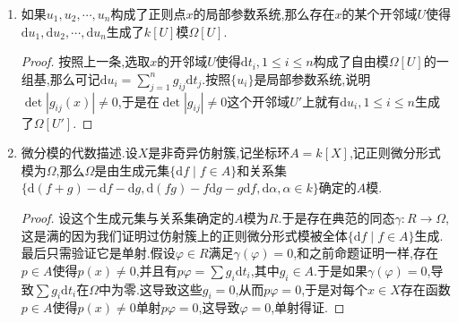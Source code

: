 \begin{enumerate}
\begin{proof}
    	设$X\subset\mathbb{A}^N$,设根理想$I(X)$由$F_1,F_2,\cdots,F_m$生成,那么在$X$上恒有$F_i\equiv0$,于是有$\sum_{j=1}^N\frac{\partial F_i}{\partial T_j}\mathrm{d}t_j=0$.如果$x\in X$是非奇异点,记$\dim_xX=n$,那么矩阵$\left((\partial F_i/\partial T_j)(x)\right)$具有秩$N-n$.不妨设$t_1,t_2,\cdots,t_n$是点$x$处的局部参数系统,于是每个$\mathrm{d}t_j$可以表示为$\mathrm{d}t_i,1\le i\le n$的有理函数系数的线性和.
    	
    	选取$x$的开邻域使得这些有理函数都是正则的,那么此时$d_yt_i,1\le i\le n$构成了$T_{X,y}^*$的基对任意$y\in U$成立.任取$\varphi\in\Omega[U]$,此时它可以唯一的表示为$\varphi=\sum_{i=1}^n\varphi_i\mathrm{d}t_i$,其中$\varphi_i$是$U$上的$k$值函数.但是我们解释过$\varphi$可以表示为正则函数系数的$\mathrm{d}t_i,1\le i\le N$的线性组合,把那些$\mathrm{d}t_i,i\ge n+1$表示为$\mathrm{d}t_i,1\le i\le n$的正则函数系数线性组合,说明这些$\varphi_i$都是$U$上的正则函数.这说明$\Omega[U]=\sum_{i=1}^nk[U]\mathrm{d}t_i$.
    	
    	最后说明这个和是直和.如果有$\sum_{i=1}^ng_i\mathrm{d}t_i=0$,不妨设$g_n\not=0$,那么$\mathrm{d}t_i,1\le i\le n$在$g_n\not=0$这个开集上是线性相关的,这就和$d_yt_i\in T_{X,y}^*,\forall y\in U$的线性无关性相矛盾,于是$\Omega[U]=\oplus_{i=1}^nk[U]\mathrm{d}t_i$.
    \end{proof}
    \item 如果$u_1,u_2,\cdots,u_n$构成了正则点$x$的局部参数系统,那么存在$x$的某个开邻域$U$使得$\mathrm{d}u_1,\mathrm{d}u_2,\cdots,\mathrm{d}u_n$生成了$k[U]$模$\Omega[U]$.
    \begin{proof}
    	
    	按照上一条,选取$x$的开邻域$U$使得$\mathrm{d}t_i,1\le i\le n$构成了自由模$\Omega[U]$的一组基,那么可记$\mathrm{d}u_i=\sum_{j=1}^ng_{ij}\mathrm{d}t_j$.按照$\{u_i\}$是局部参数系统,说明$\det|g_{ij}(x)|\not=0$,于是在$\det|g_{ij}|\not=0$这个开邻域$U'$上就有$\mathrm{d}u_i,1\le i\le n$生成了$\Omega[U']$.
    \end{proof}
    \item 微分模的代数描述.设$X$是非奇异仿射簇,记坐标环$A=k[X]$,记正则微分形式模为$\Omega$,那么$\Omega$是由生成元集$\{\mathrm{d}f\mid f\in A\}$和关系集$\{\mathrm{d}(f+g)-\mathrm{d}f-\mathrm{d}g,\mathrm{d}(fg)-f\mathrm{d}g-g\mathrm{d}f,\mathrm{d}\alpha,\alpha\in k\}$确定的$A$模.
    \begin{proof}
    	
    	设这个生成元集与关系集确定的$A$模为$R$.于是存在典范的同态$\gamma:R\to\Omega$,这是满的因为我们证明过仿射簇上的正则微分形式模被全体$\{\mathrm{d}f\mid f\in A\}$生成.最后只需验证它是单射.假设$\varphi\in R$满足$\gamma(\varphi)=0$,和之前命题证明一样,存在$p\in A$使得$p(x)\not=0$,并且有$p\varphi=\sum g_i\mathrm{d}t_i$,其中$g_i\in A$.于是如果$\gamma(\varphi)=0$,导致$\sum g_i\mathrm{d}t_i$在$\Omega$中为零.这导致这些$g_i=0$,从而$p\varphi=0$,于是对每个$x\in X$存在函数$p\in A$使得$p(x)\not=0$单射$p\varphi=0$,这导致$\varphi=0$,单射得证.
    \end{proof}
\end{enumerate}

